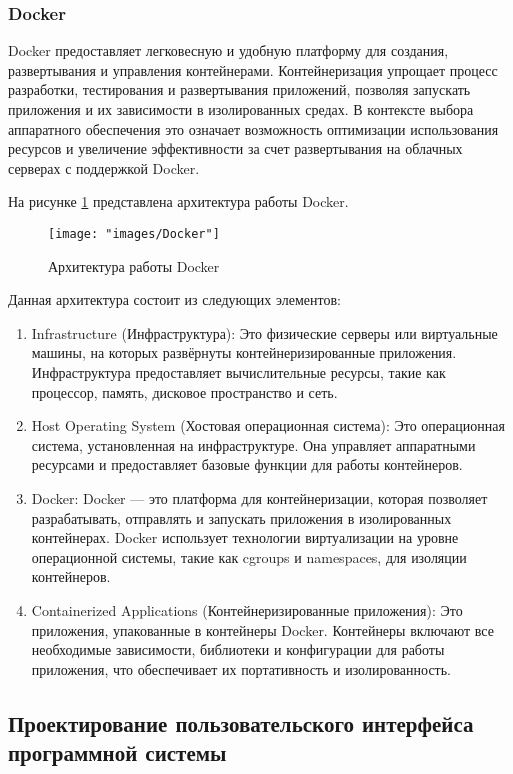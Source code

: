 \subsubsection{Docker}

Docker предоставляет легковесную и удобную платформу для создания, развертывания и управления контейнерами. Контейнеризация упрощает процесс разработки, тестирования и развертывания приложений, позволяя запускать приложения и их зависимости в изолированных средах. В контексте выбора аппаратного обеспечения это означает возможность оптимизации использования ресурсов и увеличение эффективности за счет развертывания на облачных серверах с поддержкой Docker.

На рисунке \ref{fig:-Docker} представлена архитектура работы Docker.
\begin{figure}
	\centering
	\texttt{[image: "images/Docker"]}
	\caption{Архитектура работы Docker}
	\label{fig:-Docker}
\end{figure}

Данная архитектура состоит из следующих элементов:
\begin{enumerate}
	\item Infrastructure (Инфраструктура): Это физические серверы или виртуальные машины, на которых развёрнуты контейнеризированные приложения. Инфраструктура предоставляет вычислительные ресурсы, такие как процессор, память, дисковое пространство и сеть.
	\item Host Operating System (Хостовая операционная система): Это операционная система, установленная на инфраструктуре. Она управляет аппаратными ресурсами и предоставляет базовые функции для работы контейнеров.
	\item Docker: Docker — это платформа для контейнеризации, которая позволяет разрабатывать, отправлять и запускать приложения в изолированных контейнерах. Docker использует технологии виртуализации на уровне операционной системы, такие как cgroups и namespaces, для изоляции контейнеров.
	\item Containerized Applications (Контейнеризированные приложения): Это приложения, упакованные в контейнеры Docker. Контейнеры включают все необходимые зависимости, библиотеки и конфигурации для работы приложения, что обеспечивает их портативность и изолированность.
\end{enumerate}

\subsection{Проектирование пользовательского интерфейса программной системы}
